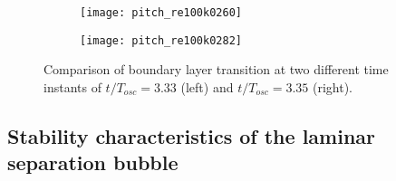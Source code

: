 \begin{figure}
	\centering
	\begin{subfigure}[t]{0.48\textwidth}
		\centering
		\texttt{[image: pitch\_re100k0260]}
		\label{fig:upstream_1}
	\end{subfigure}
	\begin{subfigure}[t]{0.48\textwidth}
		\centering
		\texttt{[image: pitch\_re100k0282]}
		\label{fig:upstream_2}
	\end{subfigure}
	\caption{Comparison of boundary layer transition at two different time instants of $t/T_{osc}=3.33$ (left) and $t/T_{osc}=3.35$ (right).}
	\label{fig:transition_complex}
\end{figure}

\subsection{Stability characteristics of the laminar separation bubble}


